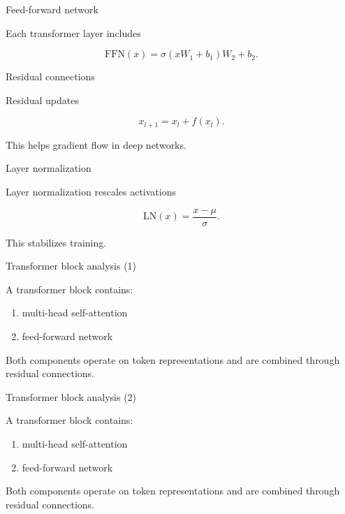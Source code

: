 \documentclass[aspectratio=169]{beamer}
\begin{document}
\begin{frame}{Feed-forward network}

Each transformer layer includes

\[
\text{FFN}(x)=\sigma(xW_1+b_1)W_2+b_2.
\]

\end{frame}


\begin{frame}{Residual connections}

Residual updates

\[
x_{l+1} = x_l + f(x_l).
\]

This helps gradient flow in deep networks.

\end{frame}


\begin{frame}{Layer normalization}

Layer normalization rescales activations

\[
\text{LN}(x) = \frac{x-\mu}{\sigma}.
\]

This stabilizes training.

\end{frame}


\begin{frame}{Transformer block analysis (1)}

A transformer block contains:

\begin{enumerate}
\item multi-head self-attention
\item feed-forward network
\end{enumerate}

Both components operate on token representations and are
combined through residual connections.

\end{frame}


\begin{frame}{Transformer block analysis (2)}

A transformer block contains:

\begin{enumerate}
\item multi-head self-attention
\item feed-forward network
\end{enumerate}

Both components operate on token representations and are
combined through residual connections.

\end{frame}
\end{document}
